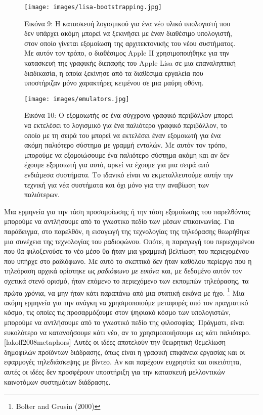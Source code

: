\documentclass[
]{article}
\begin{document}
\leavevmode{}%
\begin{figure}
\hypertarget{fig:lisa-bootstrapping}{%
\centering
\texttt{[image: images/lisa-bootstrapping.jpg]}
\caption{Εικόνα 9: Η κατασκευή λογισμικού για ένα νέο υλικό υπολογιστή
που δεν υπάρχει ακόμη μπορεί να ξεκινήσει με έναν διαθέσιμο υπολογιστή,
στον οποίο γίνεται εξομοίωση της αρχιτεκτονικής του νέου συστήματος. Με
αυτόν τον τρόπο, ο διαθέσιμος Apple II χρησιμοποιήθηκε για την κατασκευή
της γραφικής διεπαφής του Apple Lisa σε μια επαναληπτική διαδικασία, η
οποία ξεκίνησε από τα διαθέσιμα εργαλεία που υποστήριζαν μόνο χαρακτήρες
κειμένου σε μια μαύρη οθόνη.}\label{fig:lisa-bootstrapping}
}
\end{figure}

\leavevmode{}%
\begin{figure}
\hypertarget{fig:emulators}{%
\centering
\texttt{[image: images/emulators.jpg]}
\caption{Εικόνα 10: Ο εξομοιωτής σε ένα σύγχρονο γραφικό περιβάλλον
μπορεί να εκτελέσει το λογισμικό για ένα παλιότερο γραφικό περιβάλλον,
το οποίο με τη σειρά του μπορεί να εκτελέσει έναν εξομοιωτή για ένα
ακόμη παλιότερο σύστημα με γραμμή εντολών. Με αυτόν τον τρόπο, μπορούμε
να εξομοιώσουμε ένα παλιότερο σύστημα ακόμη και αν δεν έχουμε εξομοιωτή
για αυτό, αρκεί να έχουμε για μια σειρά από ενδιάμεσα συστήματα. Το
ιδανικό είναι να εκμεταλλευτούμε αυτήν την τεχνική για νέα συστήματα και
όχι μόνο για την αναβίωση των παλιότερων.}\label{fig:emulators}
}
\end{figure}

Μια ερμηνεία για την τάση προσομοίωσης ή την τάση εξομοίωσης του
παρελθόντος μπορούμε να αντλήσουμε από το γνωστικο πεδίο των μέσων
επικοινωνίας. Για παράδειγμα, στο παρελθόν, η εισαγωγή της τεχνολογίας
της τηλεόρασης θεωρήθηκε μια συνέχεια της τεχνολογίας του ραδιοφώνου.
Οπότε, η παραγωγή του περιεχομένου που θα φιλοξενούσε το νέο μέσο θα
ήταν μια γραμμική βελτίωση του περιεχομένου που υπήρχε στο ραδιόφωνο. Με
αυτό το σκεπτικό δεν ήταν καθόλου περίεργο που η τηλεόραση αρχικά
ορίστηκε ως \emph{ραδιόφωνο με εικόνα} και, με δεδομένο αυτόν τον
σχετικά στενό ορισμό, ήταν επόμενο το περιεχόμενο των εκπομπών
τηλεόρασης, τα πρώτα χρόνια, να μην ήταν κάτι παραπάνω από μια στατική
εικόνα με ήχο. \footnote{Bolter and Grusin (2000)} Μια ακόμη ερμηνεία
για την ανάγκη να χρησιμοποιούμε μεταφορές από τον πραγματικό κόσμο, τις
οποίες τις προσαρμόζουμε στον ψηφιακό κόσμο των υπολογιστών, μπορούμε να
αντλήσουμε από το γνωστικό πεδίο της φιλοσοφίας. Πράγματι, είναι
ευκολότερο να κατανοήσουμε κάτι νέο, αν το χρησιμοποιήσουμε ως κάτι
παλιότερο. {{[}}lakoff2008metaphors{{]}} Αυτές οι ιδέες αποτελούν την
θεωρητική θεμελίωση δημοφιλών προϊόντων διάδρασης, όπως είναι η γραφική
επιφάνεια εργασίας και οι εφαρμογές τηλεδιάσκεψης με βίντεο. Αν και
παρέχουν ευχρηστία και οικειότητα, αυτές οι ιδέες δεν προσφέρουν
υποστήριξη για την κατασκευή μελλοντικών καινοτόμων συστημάτων
διάδρασης.
\end{document}
